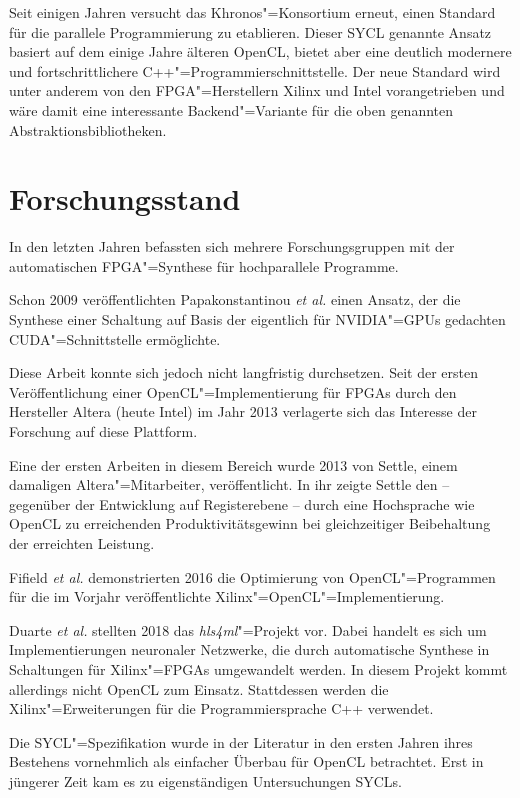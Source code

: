 Seit einigen Jahren versucht das Khronos"=Konsortium erneut, einen Standard für
die parallele Programmierung zu etablieren. Dieser SYCL genannte Ansatz basiert
auf dem einige Jahre älteren OpenCL, bietet aber eine deutlich modernere und
fortschrittlichere C++"=Programmierschnittstelle. Der neue Standard wird unter
anderem von den FPGA"=Herstellern Xilinx und Intel vorangetrieben und wäre damit
eine interessante Backend"=Variante für die oben genannten
Abstraktionsbibliotheken.

\section{Forschungsstand}\label{einleitung:forschung}

In den letzten Jahren befassten sich mehrere Forschungsgruppen mit der
automatischen \mbox{FPGA}"=Synthese für hochparallele Programme.

Schon 2009 veröffentlichten Papakonstantinou \textit{et al.} einen Ansatz, der
die Synthese einer Schaltung auf Basis der eigentlich für NVIDIA"=GPUs gedachten
CUDA"=Schnittstelle ermöglichte. \cite[vgl.][]{papakonstantinou2009} 

Diese Arbeit konnte sich jedoch nicht langfristig durchsetzen. Seit der ersten
Veröffentlichung einer OpenCL"=Implementierung für FPGAs durch den Hersteller
Altera (heute Intel) im Jahr 2013 verlagerte sich das Interesse der Forschung
auf diese Plattform. 

Eine der ersten Arbeiten in diesem Bereich wurde 2013 von Settle, einem
damaligen Altera"=Mitarbeiter, veröffentlicht. In ihr zeigte Settle den
-- gegenüber der Entwicklung auf Registerebene -- durch eine Hochsprache wie
OpenCL zu erreichenden Produktivitätsgewinn bei gleichzeitiger Beibehaltung der
erreichten Leistung. \cite[vgl.][]{settle2013}

Fifield \textit{et al.} demonstrierten 2016 die Optimierung von
OpenCL"=Programmen für die im Vorjahr veröffentlichte
Xilinx"=OpenCL"=Implementierung. \cite[vgl.][]{fifield2016}

Duarte \textit{et al.} stellten 2018 das \textit{hls4ml}"=Projekt vor. Dabei
handelt es sich um Implementierungen neuronaler Netzwerke, die durch
automatische Synthese in Schaltungen für Xilinx"=FPGAs umgewandelt werden. In
diesem Projekt kommt allerdings nicht OpenCL zum Einsatz. Stattdessen werden
die Xilinx"=Erweiterungen für die Programmiersprache C++ verwendet.
\cite[vgl.][]{duarte2018}

Die SYCL"=Spezifikation wurde in der Literatur in den ersten Jahren ihres
Bestehens vornehmlich als einfacher Überbau für OpenCL betrachtet. Erst in
jüngerer Zeit kam es zu eigenständigen Untersuchungen SYCLs.

